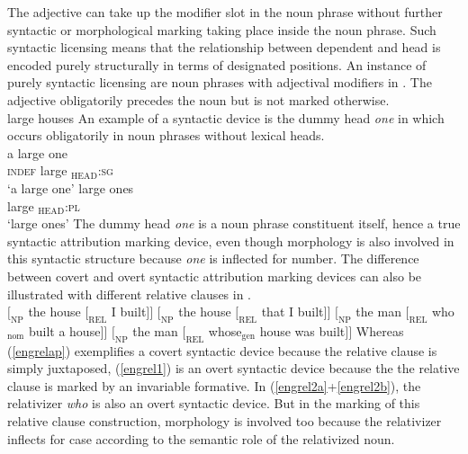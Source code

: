The adjective can take up the modifier slot in the noun phrase without further syntactic or morphological marking taking place inside the noun phrase. Such syntactic licensing means that the relationship between dependent and head is encoded purely structurally in terms of designated positions. An instance of purely syntactic licensing are noun phrases with adjectival modifiers in . The adjective obligatorily precedes the noun but is not marked otherwise.
\ea 
{}\\
large houses
\z
An example of a syntactic device is the dummy head \textit{one} in  which occurs obligatorily in noun phrases without lexical heads.
\ea
{}\\
\ea
\gll 	a large one\\
   	\textsc{indef} large $_\textrm{HEAD}$\textsc{:sg}\\
\glt ‘a large one’
\ex
\gll	large ones\\
    	large $_\textrm{HEAD}$\textsc{:pl}\\
\glt ‘large ones’
\z
\z
The dummy head \textit{one} is a noun phrase constituent itself, hence a true syntactic attribution marking device, even though morphology is also involved in this syntactic structure because \textit{one} is inflected for number. The difference between covert and overt syntactic attribution marking devices can also be illustrated with different relative clauses in .
\ea
{}\\
\ea $[_\textrm{NP}$ the house $[_\textrm{REL}$ I built$] ]$ \label{engrelap}
\ex $[_\textrm{NP}$ the house $[_\textrm{REL}$ that I built$] ]$ \label{engrel1}
\ea $[_\textrm{NP}$ the man $[_\textrm{REL}$ who$_\textrm{nom}$ built a house$] ]$ \label{engrel2a}
\ex $[_\textrm{NP}$ the man $[_\textrm{REL}$ whose$_\textrm{gen}$ house was built$] ]$ \label{engrel2b}
\z
\z
\z
Whereas (\ref{engrelap}) exemplifies a covert syntactic device because the relative clause is simply juxtaposed, (\ref{engrel1}) is an overt syntactic device because the the relative clause is marked by an invariable formative. In (\ref{engrel2a}+\ref{engrel2b}), the relativizer \textit{who} is also an overt syntactic device. But in the marking of this relative clause construction, morphology is involved too because the relativizer inflects for case according to the semantic role of the relativized noun.

